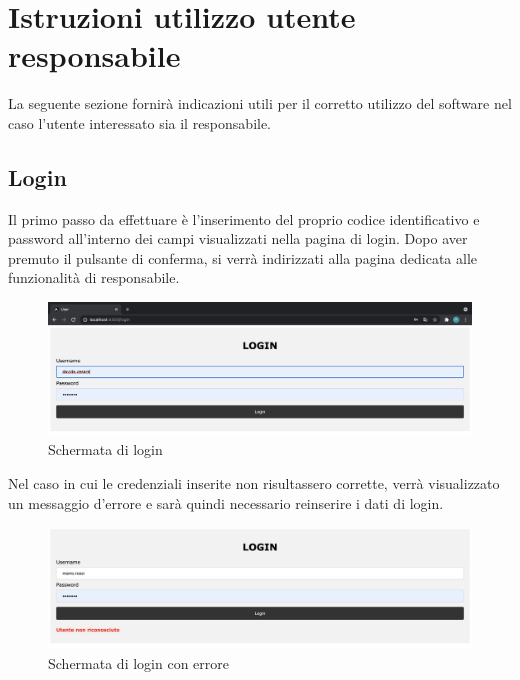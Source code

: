 \section{Istruzioni utilizzo utente responsabile}

La seguente sezione fornirà indicazioni utili per il corretto utilizzo del software nel caso l'utente interessato sia il responsabile.

\subsection{Login}
Il primo passo da effettuare è l'inserimento del proprio codice identificativo e password all'interno dei campi visualizzati nella pagina di login. Dopo aver premuto il pulsante di conferma, si verrà indirizzati alla pagina dedicata alle funzionalità di responsabile. 
\begin{figure}[H]
    \centering
    \includegraphics[scale=0.2]{res/images/login2.png}
    \caption{Schermata di login}
\end{figure}
Nel caso in cui le credenziali inserite non risultassero corrette, verrà visualizzato un messaggio d'errore e sarà quindi necessario reinserire i dati di login.
\begin{figure}[H]
    \centering
    \includegraphics[scale=0.3]{res/images/login_errato2.png}
    \caption{Schermata di login con errore}
\end{figure}

